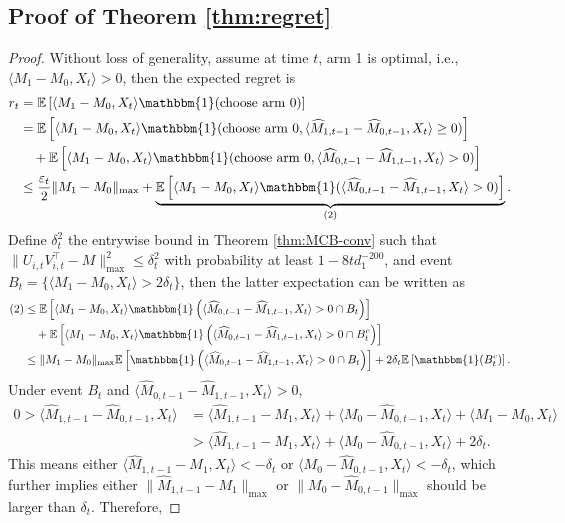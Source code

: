 \documentclass[12pt]{article}
\newcommand{\inp}[2]{\langle #1,#2\rangle}
\def\EE{{\mathbb E}}
\theoremstyle{plain}
\begin{document}
\subsection{Proof of Theorem \ref{thm:regret}}
\begin{proof}
Without loss of generality, assume at time $t$, arm 1 is optimal, i.e., $\inp{M_1-M_0}{X_t}>0$, then the expected regret is
\begin{align*}
    r_t&=\EE\left[\inp{M_1-M_0}{X_t}\mathbbm{1}(\text{choose arm 0}) \right] \\
    &= \EE\left[\inp{M_1-M_0}{X_t}\mathbbm{1}(\text{choose arm 0}, \inp{\widehat{M}_{1,t-1}-\widehat{M}_{0,t-1}}{X_t}\geq 0)\right] \\ &\quad + \EE\left[\inp{M_1-M_0}{X_t}\mathbbm{1}(\text{choose arm 0}, \inp{\widehat{M}_{0,t-1}-\widehat{M}_{1,t-1}}{X_t}> 0)\right] \\
    &\leq \frac{\varepsilon_t}{2}\|M_1-M_0\|_{\max} + \underbrace{\EE\left[\inp{M_1-M_0}{X_t}\mathbbm{1}(\inp{\widehat{M}_{0,t-1}-\widehat{M}_{1,t-1}}{X_t}> 0)\right]}_{(2)}.
\end{align*}
Define $\delta_t^2$ the entrywise bound in Theorem \ref{thm:MCB-conv} such that $\|U_{i,t}V_{i,t}^{\top} - M\|_{\max}^2\leq \delta_t^2$ with probability at least $1-8td_1^{-200}$, and event $B_t=\{\inp{M_1-M_0}{X_t}>2\delta_t\}$, then the latter expectation can be written as
\begin{align*}
    (2)&\leq \EE\left[\inp{M_1-M_0}{X_t}\mathbbm{1}\left(\inp{\widehat{M}_{0,t-1}-\widehat{M}_{1,t-1}}{X_t}> 0\cap B_t\right)\right] \\ &\quad + \EE\left[\inp{M_1-M_0}{X_t}\mathbbm{1}\left(\inp{\widehat{M}_{0,t-1}-\widehat{M}_{1,t-1}}{X_t}> 0\cap B_t^c\right)\right] \\
    &\leq \|M_1-M_0\|_{\max} \EE\left[\mathbbm{1}\left(\inp{\widehat{M}_{0,t-1}-\widehat{M}_{1,t-1}}{X_t}> 0\cap B_t\right)\right] + 2\delta_t\EE\left[\mathbbm{1}(B_t^c)\right].
\end{align*}
Under event $B_t$ and $\inp{\widehat{M}_{0,t-1}-\widehat{M}_{1,t-1}}{X_t}> 0$, 
\begin{align*}
    0>\inp{\widehat{M}_{1,t-1}-\widehat{M}_{0,t-1}}{X_t} &= \inp{\widehat{M}_{1,t-1}-M_1}{X_t} + \inp{M_0-\widehat{M}_{0,t-1}}{X_t} + \inp{M_1-M_0}{X_t}\\
    &> \inp{\widehat{M}_{1,t-1}-M_1}{X_t} + \inp{M_0-\widehat{M}_{0,t-1}}{X_t} + 2\delta_t.
\end{align*}
This means either $\inp{\widehat{M}_{1,t-1}-M_1}{X_t}<-\delta_t$ or $\inp{M_0-\widehat{M}_{0,t-1}}{X_t}<-\delta_t$, which further implies either $\|\widehat{M}_{1,t-1}-M_1\|_{\max}$ or $\|M_0-\widehat{M}_{0,t-1}\|_{\max}$ should be larger than $\delta_t$. Therefore, 

\end{proof}
\end{document}
